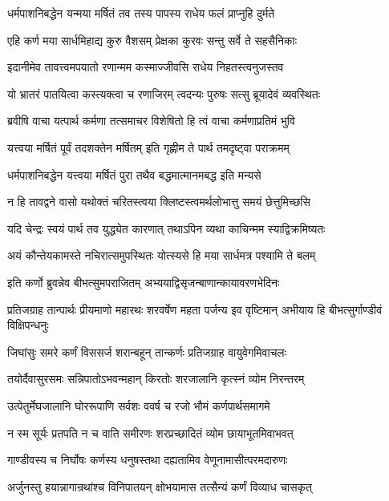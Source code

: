 \twolineshloka
{धर्मपाशनिबद्धेन यन्मया मर्षितं तव}
{तस्य पापस्य राधेय फलं प्राप्नुहि दुर्मते}


\twolineshloka
{एहि कर्ण मया सार्धमिहाद्य कुरु वैशसम्}
{प्रेक्षका कुरवः सन्तु सर्वे ते सहसैनिकाः}


\twolineshloka
{इदानीमेव तावत्त्वमपयातो रणान्मम}
{कस्माज्जीवसि राधेय निहतस्त्वनुजस्तव}


\twolineshloka
{यो भ्रातरं पातयित्वा कस्त्यक्त्वा च रणाजिरम्}
{त्वदन्यः पुरुषः सत्सु ब्रूयादेवं व्यवस्थितः}




\twolineshloka
{ब्रवीषि वाचा यत्पार्थ कर्मणा तत्समाचर}
{विशेषितो हि त्वं वाचा कर्मणाप्रतिमं भुवि}


\twolineshloka
{यत्त्वया मर्षितं पूर्वं तदशक्तेन मर्षितम्}
{इति गृह्णीम ते पार्थ तमदृष्ट्वा पराक्रमम्}


\twolineshloka
{धर्मपाशनिबद्धेन यत्त्वया मर्षितं पुरा}
{तथैव बद्धमात्मानमबद्ध इति मन्यसे}


\twolineshloka
{न हि तावद्वने वासो यथोक्तं चरितस्त्वया}
{क्लिष्टस्त्वमर्थलोभात्तु समयं छेत्तुमिच्छसि}


\twolineshloka
{यदि चेन्द्रः स्वयं पार्थ तव युद्ध्येत कारणात्}
{तथाऽपिन व्यथा काचिन्मम स्याद्विक्रमिष्यतः}


\twolineshloka
{अयं कौन्तेयकामस्ते नचिरात्समुपस्थितः}
{योत्स्यसे हि मया सार्धमत्र पश्यामि ते बलम्}



\twolineshloka
{इति कर्णो ब्रुवन्नेव बीभत्सुमपराजितम्}
{अभ्ययाद्विसृजन्बाणान्कायावरणभेदिनः}


\onelineshloka
{प्रतिजग्राह तान्पार्थः प्रीयमाणो महारथः}
\twolineshloka
{शरवर्षेण महता पर्जन्य इव वृष्टिमान्}
{अभीयाय हि बीभत्सुर्गाण्डीवं विक्षिपन्धनुः}


\twolineshloka
{जिघांसुः समरे कर्णं विससर्ज शरान्बहून्}
{तान्कर्णः प्रतिजग्राह वायुवेगमिवाचलः}


\twolineshloka
{तयोर्दैवासुरसमः सन्निपातोऽभवन्महान्}
{किरतोः शरजालानि कृत्स्नं व्योम निरन्तरम्}


\twolineshloka
{उत्पेतुर्मेघजालानि घोररूपाणि सर्वशः}
{ववर्ष च रजो भौमं कर्णपार्थसमागमे}


\twolineshloka
{न स्म सूर्यः प्रतपति न च वाति समीरणः}
{शरप्रच्छादितं व्योम छायाभूतमिवाभवत्}


\twolineshloka
{गाण्डीवस्य च निर्घोषः कर्णस्य धनुषस्तथा}
{दह्यतामिव वेणूनामासीत्परमदारुणः}


\twolineshloka
{अर्जुनस्तु हयान्नागान्रथांश्च विनिपातयन्}
{क्षोभयामास तत्सैन्यं कर्णं विव्याध चासकृत्}


